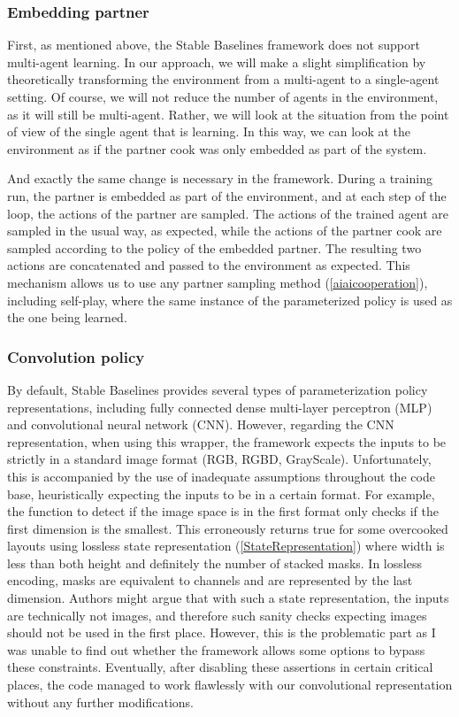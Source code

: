 \subsubsection*{Embedding partner}
First, as mentioned above, the Stable Baselines framework does not support multi-agent learning.
In our approach, we will make a slight simplification by theoretically transforming the environment from a multi-agent to a single-agent setting.
Of course, we will not reduce the number of agents in the environment, as it will still be multi-agent.
Rather, we will look at the situation from the point of view of the single agent that is learning. 
In this way, we can look at the environment as if the partner cook was only embedded as part of the system.

And exactly the same change is necessary in the framework.
During a training run, the partner is embedded as part of the environment, and at each step of the loop, the actions of the partner are sampled.
The actions of the trained agent are sampled in the usual way, as expected, while the actions of the partner cook are sampled according to the policy of the embedded partner.
The resulting two actions are concatenated and passed to the environment as expected.
This mechanism allows us to use any partner sampling method (\ref{aiaicooperation}), including self-play, where the same instance of the parameterized policy is used as the one being learned.



\subsubsection*{Convolution policy}
By default, Stable Baselines provides several types of parameterization policy representations, including fully connected dense multi-layer perceptron (MLP) and convolutional neural network (CNN).
However, regarding the CNN representation, when using this wrapper, the framework expects the inputs to be strictly in a standard image format (RGB, RGBD, GrayScale).
Unfortunately, this is accompanied by the use of inadequate assumptions throughout the code base, heuristically expecting the inputs to be in a certain format.
For example, the function to detect if the image space is in the first format only checks if the first dimension is the smallest.
This erroneously returns true for some overcooked layouts using lossless state representation (\ref{StateRepresentation}) where width is less than both height and definitely the number of stacked masks.
In lossless encoding, masks are equivalent to channels and are represented by the last dimension.
Authors might argue that with such a state representation, the inputs are technically not images, and therefore such sanity checks expecting images should not be used in the first place.
However, this is the problematic part as I was unable to find out whether the framework allows some options to bypass these constraints.
Eventually, after disabling these assertions in certain critical places, the code managed to work flawlessly with our convolutional representation without any further modifications.


